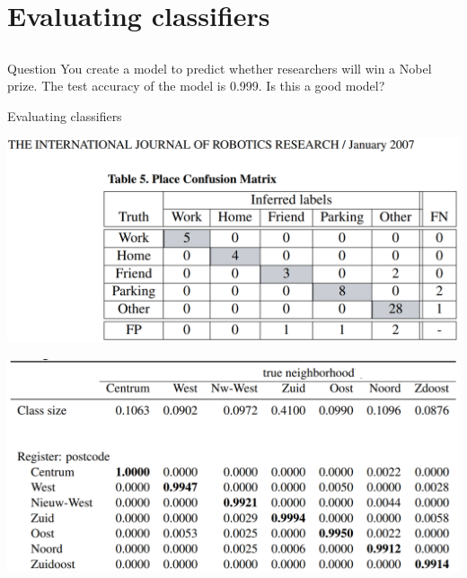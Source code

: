 \documentclass[xcolor=table,aspectratio=169]{beamer}
\begin{document}
\section{Evaluating classifiers}

\subsection{}

\begin{frame}{Question}
	You create a model to predict whether researchers will win a Nobel prize. The test accuracy of the model is 0.999. Is this a good model?
\end{frame}

\begin{frame}
	Evaluating classifiers
\end{frame}

\begin{frame}
	\includegraphics[width=\textwidth]{pics/confusion-place.png}
\end{frame}

\begin{frame}
	\includegraphics[width=\textwidth]{pics/LCA}
\end{frame}
\end{document}
